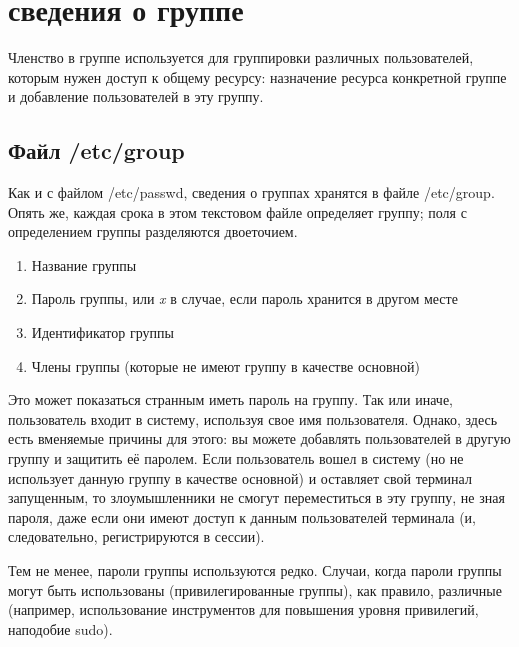 \documentclass[10pt]{book}
\begin{document}
\section{сведения о группе}

Членство в группе используется для группировки различных пользователей, которым нужен доступ к общему ресурсу: назначение ресурса конкретной группе и добавление пользователей в эту группу.

\subsection{Файл /etc/group}

Как и с файлом /etc/passwd, сведения о группах хранятся в файле /etc/group. Опять же, каждая срока
в этом текстовом файле определяет группу; поля с определением группы разделяются двоеточием.
\begin{enumerate}
 \item Название группы
 \item Пароль группы, или \textit{x} в случае, если пароль хранится в другом месте
 \item Идентификатор группы
 \item Члены группы (которые не имеют группу в качестве основной)
\end{enumerate}

Это может показаться странным иметь пароль на группу. Так или иначе, пользователь входит в систему, используя свое имя пользователя. Однако, здесь есть вменяемые причины для этого: вы можете добавлять пользователей в другую группу и защитить её паролем. Если пользователь вошел в систему (но не использует данную группу в качестве основной) и оставляет свой терминал запущенным, то злоумышленники не смогут переместиться в эту группу, не зная пароля, даже если они имеют доступ к данным пользователей терминала (и, следовательно, регистрируются в сессии). 

Тем не менее, пароли группы используются редко. Случаи, когда пароли группы могут быть использованы (привилегированные группы), как правило, различные (например, использование инструментов для повышения уровня привилегий, наподобие sudo).
\end{document}
